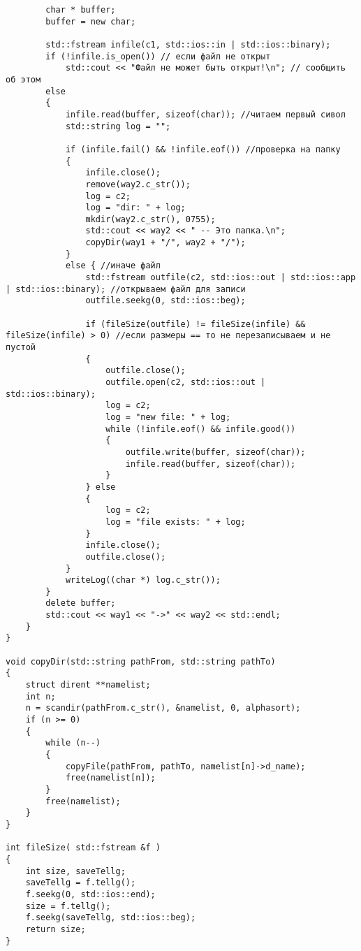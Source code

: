 \documentclass[12pt,a4paper]{scrartcl}
\begin{document}
\begin{verbatim}
        char * buffer;
        buffer = new char;
    
        std::fstream infile(c1, std::ios::in | std::ios::binary);
        if (!infile.is_open()) // если файл не открыт
            std::cout << "Файл не может быть открыт!\n"; // сообщить об этом
        else 
        {
            infile.read(buffer, sizeof(char)); //читаем первый сивол
            std::string log = "";

            if (infile.fail() && !infile.eof()) //проверка на папку
            {
                infile.close();
                remove(way2.c_str());
                log = c2;
                log = "dir: " + log;
                mkdir(way2.c_str(), 0755);
                std::cout << way2 << " -- Это папка.\n";
                copyDir(way1 + "/", way2 + "/");
            }
            else { //иначе файл
                std::fstream outfile(c2, std::ios::out | std::ios::app | std::ios::binary); //открываем файл для записи  
                outfile.seekg(0, std::ios::beg);

                if (fileSize(outfile) != fileSize(infile) && fileSize(infile) > 0) //если размеры == то не перезаписываем и не пустой
                {
                    outfile.close();
                    outfile.open(c2, std::ios::out | std::ios::binary);
                    log = c2;
                    log = "new file: " + log;
                    while (!infile.eof() && infile.good())
                    {
                        outfile.write(buffer, sizeof(char));
                        infile.read(buffer, sizeof(char));
                    }
                } else 
                {
                    log = c2;
                    log = "file exists: " + log;
                }
                infile.close();
                outfile.close();
            }
            writeLog((char *) log.c_str());
        }
        delete buffer;
        std::cout << way1 << "->" << way2 << std::endl;
    }
}

void copyDir(std::string pathFrom, std::string pathTo)
{
    struct dirent **namelist;
    int n;
    n = scandir(pathFrom.c_str(), &namelist, 0, alphasort);
    if (n >= 0)
    {
        while (n--) 
        {
            copyFile(pathFrom, pathTo, namelist[n]->d_name);           
            free(namelist[n]);
        }
        free(namelist);
    }
}

int fileSize( std::fstream &f )
{
    int size, saveTellg;
    saveTellg = f.tellg();
    f.seekg(0, std::ios::end);
    size = f.tellg();
    f.seekg(saveTellg, std::ios::beg);
    return size;
}
\end{verbatim}
	\newpage
\end{document}
